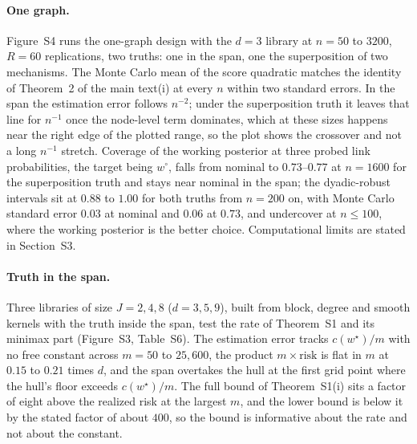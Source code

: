 \documentclass[12pt]{article}
\newcommand{\wstar}{w^{\star}}
\begin{document}
\paragraph{One graph.} Figure~S4 runs the one-graph design with the $d=3$ library at $n=50$ to $3200$, $R=60$ replications, two truths: one in the span, one the superposition of two mechanisms. The Monte Carlo mean of the score quadratic matches the identity of Theorem~2 of the main text(i) at every $n$ within two standard errors. In the span the estimation error follows $n^{-2}$; under the superposition truth it leaves that line for $n^{-1}$ once the node-level term dominates, which at these sizes happens near the right edge of the plotted range, so the plot shows the crossover and not a long $n^{-1}$ stretch. Coverage of the working posterior at three probed link probabilities, the target being $w^{\circ}$, falls from nominal to $0.73$--$0.77$ at $n=1600$ for the superposition truth and stays near nominal in the span; the dyadic-robust intervals sit at $0.88$ to $1.00$ for both truths from $n=200$ on, with Monte Carlo standard error $0.03$ at nominal and $0.06$ at $0.73$, and undercover at $n\le100$, where the working posterior is the better choice. Computational limits are stated in Section~S3.

\paragraph{Truth in the span.} Three libraries of size $J=2,4,8$ ($d=3,5,9$), built from block, degree and smooth kernels with the truth inside the span, test the rate of Theorem~S1 and its minimax part (Figure~S3, Table~S6). The estimation error tracks $c(\wstar)/m$ with no free constant across $m=50$ to $25{,}600$, the product $m\times\text{risk}$ is flat in $m$ at $0.15$ to $0.21$ times $d$, and the span overtakes the hull at the first grid point where the hull's floor exceeds $c(\wstar)/m$. The full bound of Theorem~S1(i) sits a factor of eight above the realized risk at the largest $m$, and the lower bound is below it by the stated factor of about $400$, so the bound is informative about the rate and not about the constant.
\end{document}
